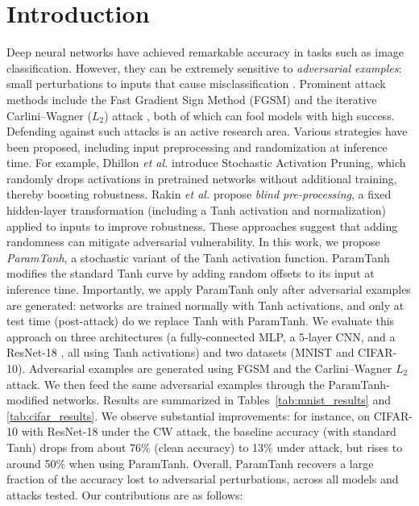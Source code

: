 \documentclass{llncs}
\begin{document}
\section{Introduction}
Deep neural networks have achieved remarkable accuracy in tasks such as image classification. However, they can be extremely sensitive to \emph{adversarial examples}: small perturbations to inputs that cause misclassification \cite{Goodfellow2015}. Prominent attack methods include the Fast Gradient Sign Method (FGSM) \cite{Goodfellow2015} and the iterative Carlini–Wagner ($L_2$) attack \cite{CarliniWagner2017}, both of which can fool models with high success. Defending against such attacks is an active research area. Various strategies have been proposed, including input preprocessing and randomization at inference time. For example, Dhillon \emph{et al.} \cite{Dhillon2018} introduce Stochastic Activation Pruning, which randomly drops activations in pretrained networks without additional training, thereby boosting robustness. Rakin \emph{et al.} \cite{Rakin2018} propose \emph{blind pre-processing}, a fixed hidden-layer transformation (including a Tanh activation and normalization) applied to inputs to improve robustness. These approaches suggest that adding randomness can mitigate adversarial vulnerability. In this work, we propose \emph{ParamTanh}, a stochastic variant of the Tanh activation function. ParamTanh modifies the standard Tanh curve by adding random offsets to its input at inference time. Importantly, we apply ParamTanh only after adversarial examples are generated: networks are trained normally with Tanh activations, and only at test time (post-attack) do we replace Tanh with ParamTanh. We evaluate this approach on three architectures (a fully-connected MLP, a 5-layer CNN, and a ResNet-18 \cite{He2016}, all using Tanh activations) and two datasets (MNIST and CIFAR-10). Adversarial examples are generated using FGSM and the Carlini–Wagner $L_2$ attack. We then feed the same adversarial examples through the ParamTanh-modified networks. Results are summarized in Tables~\ref{tab:mnist_results} and \ref{tab:cifar_results}. We observe substantial improvements: for instance, on CIFAR-10 with ResNet-18 under the CW attack, the baseline accuracy (with standard Tanh) drops from about 76\% (clean accuracy) to 13\% under attack, but rises to around 50\% when using ParamTanh. Overall, ParamTanh recovers a large fraction of the accuracy lost to adversarial perturbations, across all models and attacks tested. Our contributions are as follows:
\end{document}

